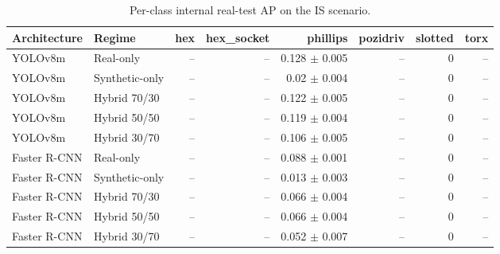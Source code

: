 \begin{table}
\caption{Per-class internal real-test AP on the IS scenario.}
\label{tab:is_class_ap}
\begin{tabular}{llrrrrrr}
\toprule
Architecture & Regime & hex & hex_socket & phillips & pozidriv & slotted & torx \\
\midrule
YOLOv8m & Real-only & -- & -- & 0.128 $\pm$ 0.005 & -- & 0 & -- \\
YOLOv8m & Synthetic-only & -- & -- & 0.02 $\pm$ 0.004 & -- & 0 & -- \\
YOLOv8m & Hybrid 70/30 & -- & -- & 0.122 $\pm$ 0.005 & -- & 0 & -- \\
YOLOv8m & Hybrid 50/50 & -- & -- & 0.119 $\pm$ 0.004 & -- & 0 & -- \\
YOLOv8m & Hybrid 30/70 & -- & -- & 0.106 $\pm$ 0.005 & -- & 0 & -- \\
Faster R-CNN & Real-only & -- & -- & 0.088 $\pm$ 0.001 & -- & 0 & -- \\
Faster R-CNN & Synthetic-only & -- & -- & 0.013 $\pm$ 0.003 & -- & 0 & -- \\
Faster R-CNN & Hybrid 70/30 & -- & -- & 0.066 $\pm$ 0.004 & -- & 0 & -- \\
Faster R-CNN & Hybrid 50/50 & -- & -- & 0.066 $\pm$ 0.004 & -- & 0 & -- \\
Faster R-CNN & Hybrid 30/70 & -- & -- & 0.052 $\pm$ 0.007 & -- & 0 & -- \\
\bottomrule
\end{tabular}
\end{table}
